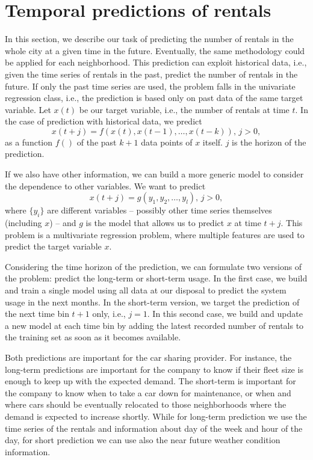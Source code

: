 \section{Temporal predictions of rentals}
\label{sec:regression}

In this section, we describe our task of predicting the number of rentals in the whole city at a given time in the future. Eventually, the same methodology could be applied for each neighborhood. 
This prediction can exploit historical data, i.e., given the time series of rentals in the past, predict the number of rentals in the future. 
If only the past time series are used, the problem falls in the univariate regression class, i.e., the prediction is based only on past data of the same target variable.
Let $x(t)$ be our target variable, i.e., the number of rentals at time $t$.
In the case of prediction with historical data, we predict 
\[
x(t+j)=f(x(t),x(t-1),\ldots, x(t-k)), \, j>0,
\]
as a function $f()$ of the past $k+1$ data points of $x$ itself. $j$ is the horizon of the prediction.

If we also have other information, we can build a more generic model to consider the dependence to other variables. 
We want to predict
\[
x(t+j)=g(y_1,y_2,\ldots, y_l), \, j>0,
\]
where $\{y_i\}$ are different variables -- possibly other time series themselves (including $x$) -- and $g$ is the model that allows us to predict $x$ at time $t+j$.
This problem is a multivariate regression problem, where multiple features are used to predict the target variable $x$.

Considering the time horizon of the prediction, we can formulate two versions of the problem: predict the long-term or short-term usage. In the first case, we build and train a single model using all data at our disposal to predict the system usage in the next months.
In the short-term version, we target the prediction of the next time bin $t+1$ only, i.e., $j=1$. In this second case, we build and update a new model at each time bin by adding the latest recorded number of rentals to the training set as soon as it becomes available. 

Both predictions are important for the car sharing provider. For instance, the long-term predictions are important for the company to know if their fleet size is enough to keep up with the expected demand. The short-term is important for the company to know when to take a car down for maintenance, or when and where cars should be eventually relocated to those neighborhoods where the demand is expected to increase shortly. While for long-term prediction we use the time series of the rentals and information about day of the week and hour of the day, for short prediction we can use also the near future weather condition information.  


